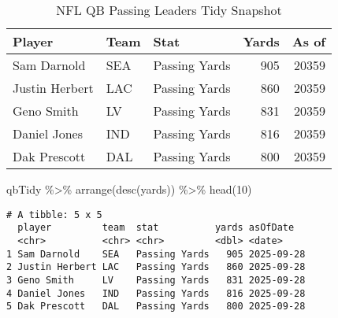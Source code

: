 \documentclass[
  letterpaper,
  DIV=11,
  numbers=noendperiod]{scrartcl}
\newenvironment{Shaded}{\begin{snugshade}}{\end{snugshade}}
\newcommand{\DecValTok}[1]{\textcolor[rgb]{0.68,0.00,0.00}{#1}}
\newcommand{\FunctionTok}[1]{\textcolor[rgb]{0.28,0.35,0.67}{#1}}
\newcommand{\NormalTok}[1]{\textcolor[rgb]{0.00,0.23,0.31}{#1}}
\newcommand{\SpecialCharTok}[1]{\textcolor[rgb]{0.37,0.37,0.37}{#1}}
\begin{document}
\begin{table}
\caption*{
{\fontsize{20}{25}\selectfont  NFL QB Passing Leaders \textemdash Tidy Snapshot\fontsize{12}{15}\selectfont }
} 
\fontsize{12.0pt}{14.0pt}\selectfont
\begin{tabular*}{\linewidth}{@{\extracolsep{\fill}}lllrr}
\toprule
Player & Team & Stat & Yards & As of \\ 
\midrule\addlinespace[2.5pt]
Sam Darnold & SEA & Passing Yards & 905 & 20359 \\ 
Justin Herbert & LAC & Passing Yards & 860 & 20359 \\ 
Geno Smith & LV & Passing Yards & 831 & 20359 \\ 
Daniel Jones & IND & Passing Yards & 816 & 20359 \\ 
Dak Prescott & DAL & Passing Yards & 800 & 20359 \\ 
\bottomrule
\end{tabular*}
\end{table}

\begin{Shaded}
\begin{Highlighting}[]
\NormalTok{qbTidy }\SpecialCharTok{\%\textgreater{}\%} 
  \FunctionTok{arrange}\NormalTok{(}\FunctionTok{desc}\NormalTok{(yards)) }\SpecialCharTok{\%\textgreater{}\%} 
  \FunctionTok{head}\NormalTok{(}\DecValTok{10}\NormalTok{)}
\end{Highlighting}
\end{Shaded}

\begin{verbatim}
# A tibble: 5 x 5
  player         team  stat          yards asOfDate  
  <chr>          <chr> <chr>         <dbl> <date>    
1 Sam Darnold    SEA   Passing Yards   905 2025-09-28
2 Justin Herbert LAC   Passing Yards   860 2025-09-28
3 Geno Smith     LV    Passing Yards   831 2025-09-28
4 Daniel Jones   IND   Passing Yards   816 2025-09-28
5 Dak Prescott   DAL   Passing Yards   800 2025-09-28
\end{verbatim}
\end{document}
